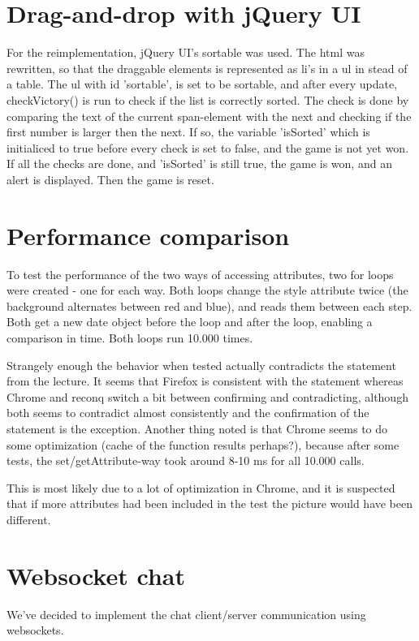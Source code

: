 \documentclass[a4paper,10pt]{article}
\begin{document}
\section*{Drag-and-drop with jQuery UI}
For the reimplementation, jQuery UI's sortable was used.
The html was rewritten, so that the draggable elements is represented as li's in a ul in stead of a table.
The ul with id 'sortable', is set to be sortable, and after every update, checkVictory() is run to check if the list is correctly sorted.
The check is done by comparing the text of the current span-element with the next and checking if the first number is larger then the next. If so, the variable 'isSorted' which is initialiced to true before every check is set to false, and the game is not yet won.
If all the checks are done, and 'isSorted' is still true, the game is won, and an alert is displayed. Then the game is reset.

\section*{Performance comparison}
To test the performance of the two ways of accessing attributes, two
for loops were created - one for each way.  Both loops change the
style attribute twice (the background alternates between red and
blue), and reads them between each step.  Both get a new date object
before the loop and after the loop, enabling a comparison in time.
Both loops run 10.000 times.

Strangely enough the behavior when tested actually contradicts the
statement from the lecture.  It seems that Firefox is consistent with
the statement whereas Chrome and reconq switch a bit between
confirming and contradicting, although both seems to contradict almost
consistently and the confirmation of the statement is the exception.
Another thing noted is that Chrome seems to do some optimization
(cache of the function results perhaps?), because after some tests,
the set/getAttribute-way took around 8-10 ms for all 10.000 calls.

This is most likely due to a lot of optimization in Chrome, and it is
suspected that if more attributes had been included in the test the
picture would have been different.

\section*{Websocket chat}
We've decided to implement the chat client/server communication using websockets.
\end{document}
